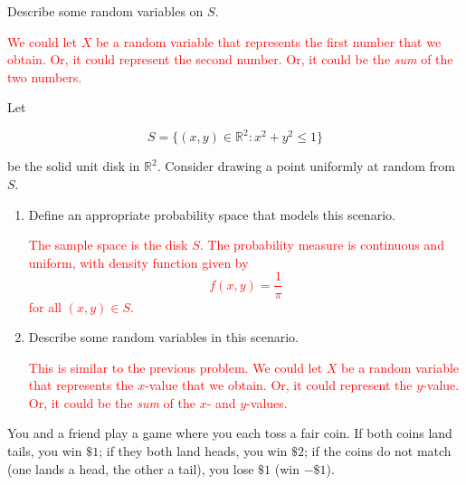 \documentclass[12pt,reqno]{amsart}
\begin{document}
Describe some random variables on $S$.

\bigskip
\textcolor{red}{We could let $X$ be a random variable that represents the first number that we obtain. Or, it could represent the second number. Or, it could be the \textit{sum} of the two numbers.}
\bigskip























\bigskip
\prob Let

	\[
	S = \{ (x,y) \in \mathbb{R}^2 : x^2+y^2 \leq 1\}
	\]

be the solid unit disk in $\mathbb{R}^2$. Consider drawing a point uniformly at random from $S$.

\medskip
\begin{enumerate}
\item Define an appropriate probability space that models this scenario.

\bigskip
\textcolor{red}{The sample space is the disk $S$. The probability measure is continuous and uniform, with density function given by
	\[
	f(x,y) = \frac{1}{\pi}
	\]
for all $(x,y)\in S$.}
\bigskip

\item Describe some random variables in this scenario.

\bigskip
\textcolor{red}{This is similar to the previous problem. We could let $X$ be a random variable that represents the $x$-value that we obtain. Or, it could represent the $y$-value. Or, it could be the \textit{sum} of the $x$- and $y$-values.}
\bigskip
\end{enumerate}

























\bigskip
\prob You and a friend play a game where you each toss a fair coin. If both coins land tails, you win $\$1$; if they both land heads, you win $\$2$; if the coins do not match (one lands a head, the other a tail), you lose $\$1$ (win $-\$1$).
\end{document}
